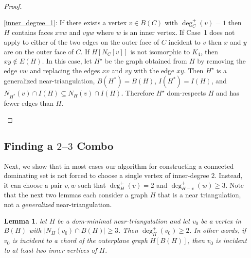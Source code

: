 \documentclass{article}
\newcommand{\pat}[1]{\textcolor{red}{PM: #1}}
\newcommand{\hussein}[1]{\textcolor{purple}{HH: #1}}
\newtheorem{lem}{Lemma}
\theoremstyle{definition}
\begin{document}
\begin{proof}
\begin{compactenum}
    \item \cref{inner_degree_1}: If there exists a vertex $v\in B(C)$ with $\deg^+_C(v)=1$ then $H$ contains faces $xvw$ and $vyw$ where $w$ is an inner vertex.  If Case~1 does not apply to either of the two edges on the outer face of $C$ incident to $v$ then $x$ and $y$ are on the outer face of $C$. If $H[N_C[v]]$ is not isomorphic to $K_4$, then $xy\not\in E(H)$.  In this case, let $H^\star$ be the graph obtained from $H$ by removing the edge $vw$ and replacing the edges $xv$ and $vy$ with the edge $xy$. Then $H^\star$ is a generalized near-triangulation, $B(H^*)=B(H)$, $I(H^*)=I(H)$, and $N_{H^*}(v)\cap I(H)\subseteq N_{H}(v)\cap I(H)$.  Therefore $H^\star$ dom-respects $H$ and has fewer edges than $H$. \qedhere

  \end{compactenum}
\end{proof}

\subsection{Finding a $2$--$3$ Combo}
\label{combo}

Next, we show that in most cases our algorithm for constructing a connected dominating set is not forced to choose a single vertex of inner-degree $2$. Instead, it can choose a pair $v,w$ such that $\deg^+_H(v)=2$ and $\deg^+_{H-v}(w)\ge 3$. Note that the next two lemmas each consider a graph $H$ that is a near triangulation, not a \emph{generalized} near-triangulation.

\begin{lem}\label{chord_incident}
  let $H$ be a dom-minimal near-triangulation and let $v_0$ be a vertex in $B(H)$ with $|N_H(v_0)\cap B(H)|\ge 3$.  Then $\deg^+_H(v_0)\ge 2$.  In other words, if $v_0$ is incident to a chord of the outerplane graph $H[B(H)]$, then $v_0$ is incident to at least two inner vertices of $H$.
\end{lem}
\end{document}

